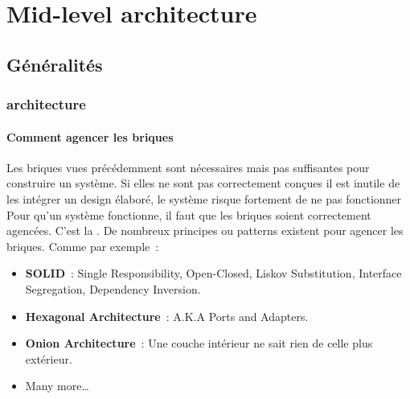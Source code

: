 \documentclass{beamer}
\begin{document}
    \section{Mid-level architecture}\label{sec:mid-level-architecture}

    \subsection{Généralités}\label{subsec:mid-level-generalites}

    \begin{frame}
        \transdissolve
        \frametitle{ architecture}
        \framesubtitle{Comment agencer les briques}
        Les briques vues précédemment sont nécessaires mais pas suffisantes pour construire un système.
        Si elles ne sont pas correctement conçues il est inutile de les intégrer un design élaboré, le système risque fortement de ne pas fonctionner
        \bigbreak
        Pour qu'un système fonctionne, il faut que les briques soient correctement agencées.
        C'est la .
        \bigbreak
        De nombreux principes ou patterns existent pour agencer les briques.
        Comme par exemple~:
        \begin{itemize}
            \item \textbf{SOLID}~: Single Responsibility, Open-Closed, Liskov Substitution, Interface Segregation, Dependency Inversion.
            \item \textbf{Hexagonal Architecture}~: A.K.A Ports and Adapters.
            \item \textbf{Onion Architecture}~: Une couche intérieur ne sait rien de celle plus extérieur.
            \item Many more\ldots
        \end{itemize}
    \end{frame}
\end{document}
